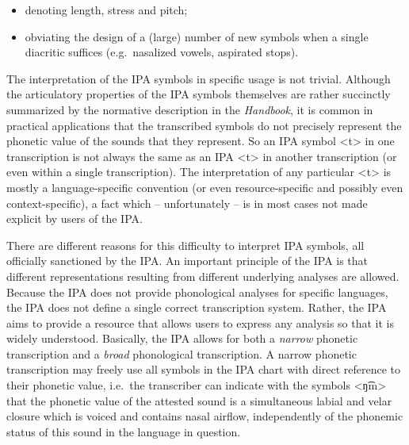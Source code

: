 \begin{itemize}

 	\item denoting length, stress and pitch;
	\item obviating the design of a (large) number of new symbols when a 
		  single diacritic suffices (e.g.\ nasalized vowels, aspirated stops). 
               
\end{itemize}	

The interpretation of the IPA symbols in specific usage is not trivial. Although
the articulatory properties of the IPA symbols themselves are rather succinctly
summarized by the normative description in the \textit{Handbook}, it is common
in practical applications that the transcribed symbols do not precisely
represent the phonetic value of the sounds that they represent. So an IPA symbol
<t> in one transcription is not always the same as an IPA <t> in another
transcription (or even within a single transcription). The interpretation of any
particular <t> is mostly a language-specific convention (or even
resource-specific and possibly even context-specific), a fact which --
unfortunately -- is in most cases not made explicit by users of the IPA.

There are different reasons for this difficulty to interpret IPA symbols, all
officially sanctioned by the IPA. An important principle of the IPA is that
different representations resulting from different underlying analyses are
allowed. Because the IPA does not provide phonological analyses for specific
languages, the IPA does not define a single correct transcription system.
Rather, the IPA aims to provide a resource that allows users to express any
analysis so that it is widely understood. Basically, the IPA allows for both a 
\textit{narrow} phonetic transcription and a \textit{broad} phonological transcription. 
A narrow phonetic transcription may freely use all symbols in the IPA 
chart with direct reference to their phonetic value, i.e.\ the transcriber can 
indicate with the symbols <ŋ͡m> that the phonetic value of the attested sound 
is a simultaneous labial and velar closure which is voiced and contains nasal 
airflow, independently of the phonemic status of this sound in the language in 
question. 


